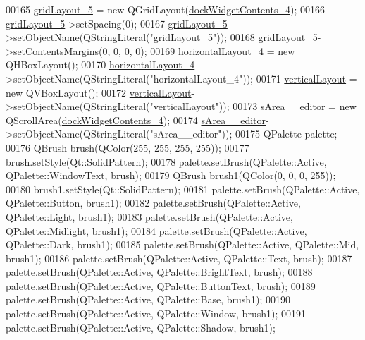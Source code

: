 \begin{DoxyCode}
00165         \hyperlink{a00026_ac56612bd2595405ccbdfe4aae45eccd7}{gridLayout\_5} = \textcolor{keyword}{new} QGridLayout(\hyperlink{a00026_a20ad5110f0fb7b329d067d354f8c9409}{dockWidgetContents\_4});
00166         \hyperlink{a00026_ac56612bd2595405ccbdfe4aae45eccd7}{gridLayout\_5}->setSpacing(0);
00167         \hyperlink{a00026_ac56612bd2595405ccbdfe4aae45eccd7}{gridLayout\_5}->setObjectName(QStringLiteral(\textcolor{stringliteral}{"gridLayout\_5"}));
00168         \hyperlink{a00026_ac56612bd2595405ccbdfe4aae45eccd7}{gridLayout\_5}->setContentsMargins(0, 0, 0, 0);
00169         \hyperlink{a00026_a42671894c25bd8dfcc6c0a1f8689ecb8}{horizontalLayout\_4} = \textcolor{keyword}{new} QHBoxLayout();
00170         \hyperlink{a00026_a42671894c25bd8dfcc6c0a1f8689ecb8}{horizontalLayout\_4}->setObjectName(QStringLiteral(\textcolor{stringliteral}{"horizontalLayout\_4"}));
00171         \hyperlink{a00026_a11b9c1ae90724f0bcd67c76045c93704}{verticalLayout} = \textcolor{keyword}{new} QVBoxLayout();
00172         \hyperlink{a00026_a11b9c1ae90724f0bcd67c76045c93704}{verticalLayout}->setObjectName(QStringLiteral(\textcolor{stringliteral}{"verticalLayout"}));
00173         \hyperlink{a00026_a6f79b6b1fe81457d76b076a543ee4089}{sArea\_\_editor} = \textcolor{keyword}{new} QScrollArea(\hyperlink{a00026_a20ad5110f0fb7b329d067d354f8c9409}{dockWidgetContents\_4});
00174         \hyperlink{a00026_a6f79b6b1fe81457d76b076a543ee4089}{sArea\_\_editor}->setObjectName(QStringLiteral(\textcolor{stringliteral}{"sArea\_\_editor"}));
00175         QPalette palette;
00176         QBrush brush(QColor(255, 255, 255, 255));
00177         brush.setStyle(Qt::SolidPattern);
00178         palette.setBrush(QPalette::Active, QPalette::WindowText, brush);
00179         QBrush brush1(QColor(0, 0, 0, 255));
00180         brush1.setStyle(Qt::SolidPattern);
00181         palette.setBrush(QPalette::Active, QPalette::Button, brush1);
00182         palette.setBrush(QPalette::Active, QPalette::Light, brush1);
00183         palette.setBrush(QPalette::Active, QPalette::Midlight, brush1);
00184         palette.setBrush(QPalette::Active, QPalette::Dark, brush1);
00185         palette.setBrush(QPalette::Active, QPalette::Mid, brush1);
00186         palette.setBrush(QPalette::Active, QPalette::Text, brush);
00187         palette.setBrush(QPalette::Active, QPalette::BrightText, brush);
00188         palette.setBrush(QPalette::Active, QPalette::ButtonText, brush);
00189         palette.setBrush(QPalette::Active, QPalette::Base, brush1);
00190         palette.setBrush(QPalette::Active, QPalette::Window, brush1);
00191         palette.setBrush(QPalette::Active, QPalette::Shadow, brush1);

\end{DoxyCode}
